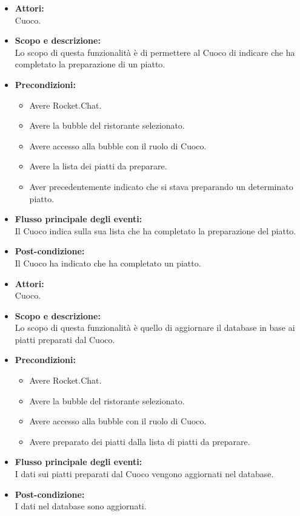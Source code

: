 \begin{itemize}
	\item \textbf{Attori:}
	\\Cuoco.
	\item \textbf{Scopo e descrizione:} 
	\\Lo scopo di questa funzionalità è di permettere al Cuoco di indicare che ha completato la preparazione di un piatto.
	\item \textbf{Precondizioni:}
	\begin{itemize}
		\item Avere Rocket.Chat.
		\item Avere la bubble del ristorante selezionato.
		\item Avere accesso alla bubble con il ruolo di Cuoco.
		\item Avere la lista dei piatti da preparare.
		\item Aver precedentemente indicato che si stava preparando un determinato piatto.
	\end{itemize}
	\item \textbf{Flusso principale degli eventi:}
	\\Il Cuoco indica sulla sua lista che ha completato la preparazione del piatto.
	\item \textbf{Post-condizione:}
	\\Il Cuoco ha indicato che ha completato un piatto.
\end{itemize}


\begin{itemize}
	\item \textbf{Attori:}
	\\Cuoco.
	\item \textbf{Scopo e descrizione:} 
	\\Lo scopo di questa funzionalità è quello di aggiornare il database in base ai piatti preparati dal Cuoco.
	\item \textbf{Precondizioni:}
	\begin{itemize}
		\item Avere Rocket.Chat.
		\item Avere la bubble del ristorante selezionato.
		\item Avere accesso alla bubble con il ruolo di Cuoco.
		\item Avere preparato dei piatti dalla lista di piatti da preparare.
	\end{itemize}
	\item \textbf{Flusso principale degli eventi:}
	\\I dati sui piatti preparati dal Cuoco vengono aggiornati nel database.
	\item \textbf{Post-condizione:}
	\\I dati nel database sono aggiornati.
\end{itemize}